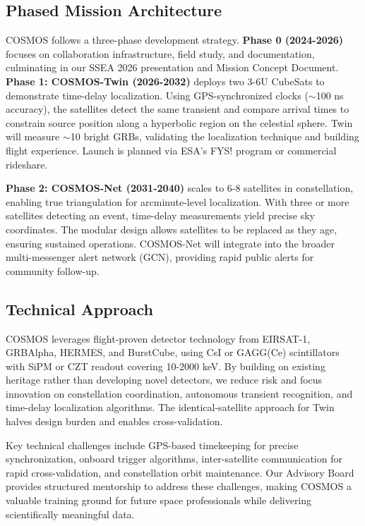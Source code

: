 \documentclass[11pt]{article}
\begin{document}
\subsection*{Phased Mission Architecture}

COSMOS follows a three-phase development strategy. \textbf{Phase 0 (2024-2026)} focuses on collaboration infrastructure, field study, and documentation, culminating in our SSEA 2026 presentation and Mission Concept Document. \textbf{Phase 1: COSMOS-Twin (2026-2032)} deploys two 3-6U CubeSats to demonstrate time-delay localization. Using GPS-synchronized clocks ($\sim$100 ns accuracy), the satellites detect the same transient and compare arrival times to constrain source position along a hyperbolic region on the celestial sphere. Twin will measure $\sim$10 bright GRBs, validating the localization technique and building flight experience. Launch is planned via ESA's FYS! program or commercial rideshare.

\textbf{Phase 2: COSMOS-Net (2031-2040)} scales to 6-8 satellites in constellation, enabling true triangulation for arcminute-level localization. With three or more satellites detecting an event, time-delay measurements yield precise sky coordinates. The modular design allows satellites to be replaced as they age, ensuring sustained operations. COSMOS-Net will integrate into the broader multi-messenger alert network (GCN), providing rapid public alerts for community follow-up.

\subsection*{Technical Approach}

COSMOS leverages flight-proven detector technology from EIRSAT-1, GRBAlpha, HERMES, and BurstCube, using CsI or GAGG(Ce) scintillators with SiPM or CZT readout covering 10-2000 keV. By building on existing heritage rather than developing novel detectors, we reduce risk and focus innovation on constellation coordination, autonomous transient recognition, and time-delay localization algorithms. The identical-satellite approach for Twin halves design burden and enables cross-validation.

Key technical challenges include GPS-based timekeeping for precise synchronization, onboard trigger algorithms, inter-satellite communication for rapid cross-validation, and constellation orbit maintenance. Our Advisory Board provides structured mentorship to address these challenges, making COSMOS a valuable training ground for future space professionals while delivering scientifically meaningful data.
\end{document}
